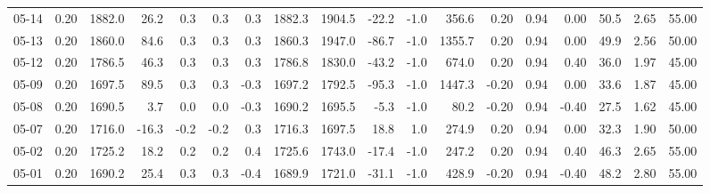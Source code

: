 \begin{threeparttable}
{\begin{tabular}{lrrrrrrrrrrrrrrrrr}
  05-14 &     0.20 & 1882.0 &              26.2 &               0.3 &                0.3 &                0.3 & 1882.3 & 1904.5 &      -22.2 &                     -1.0 &               356.6 &       0.20 &      0.94 &           0.00 &             50.5 &            2.65 &                  55.00 \\
  05-13 &     0.20 & 1860.0 &              84.6 &               0.3 &                0.3 &                0.3 & 1860.3 & 1947.0 &      -86.7 &                     -1.0 &              1355.7 &       0.20 &      0.94 &           0.00 &             49.9 &            2.56 &                  50.00 \\
  05-12 &     0.20 & 1786.5 &              46.3 &               0.3 &                0.3 &                0.3 & 1786.8 & 1830.0 &      -43.2 &                     -1.0 &               674.0 &       0.20 &      0.94 &           0.40 &             36.0 &            1.97 &                  45.00 \\
  05-09 &     0.20 & 1697.5 &              89.5 &               0.3 &                0.3 &               -0.3 & 1697.2 & 1792.5 &      -95.3 &                     -1.0 &              1447.3 &      -0.20 &      0.94 &           0.00 &             33.6 &            1.87 &                  45.00 \\
  05-08 &     0.20 & 1690.5 &               3.7 &               0.0 &                0.0 &               -0.3 & 1690.2 & 1695.5 &       -5.3 &                     -1.0 &                80.2 &      -0.20 &      0.94 &          -0.40 &             27.5 &            1.62 &                  45.00 \\
  05-07 &     0.20 & 1716.0 &             -16.3 &              -0.2 &               -0.2 &                0.3 & 1716.3 & 1697.5 &       18.8 &                      1.0 &               274.9 &       0.20 &      0.94 &           0.00 &             32.3 &            1.90 &                  50.00 \\
  05-02 &     0.20 & 1725.2 &              18.2 &               0.2 &                0.2 &                0.4 & 1725.6 & 1743.0 &      -17.4 &                     -1.0 &               247.2 &       0.20 &      0.94 &           0.40 &             46.3 &            2.65 &                  55.00 \\
  05-01 &     0.20 & 1690.2 &              25.4 &               0.3 &                0.3 &               -0.4 & 1689.9 & 1721.0 &      -31.1 &                     -1.0 &               428.9 &      -0.20 &      0.94 &          -0.40 &             48.2 &            2.80 &                  55.00 \\

\end{tabular}}
\end{threeparttable}
